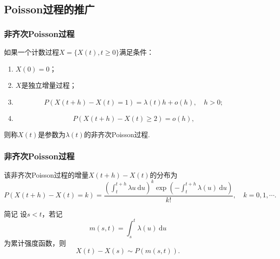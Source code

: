 \subsection{Poisson过程的推广}

\begin{frame}
    \frametitle{非齐次Poisson过程}
    \begin{mydefinition}[非齐次Poisson过程]
        如果一个计数过程$X=\{X(t),t\geqslant 0\}$满足条件：
        \begin{enumerate}
            \item $X(0)=0$；
            \item $X$是独立增量过程；
            \item \begin{equation}
                P(X(t+h)-X(t)=1)=\lambda(t)h+o(h),\quad h>0;
            \end{equation}
            \item \begin{equation}
                P(X(t+h)-X(t)\geqslant 2)=o(h),
            \end{equation}
        \end{enumerate}
        则称$X(t)$是参数为$\lambda(t)$的非齐次Poisson过程. 
    \end{mydefinition}

\end{frame}

\begin{frame}
    \frametitle{非齐次Poisson过程}
    \begin{myproposition}[非齐次Poisson过程的分布]
        该非齐次Poisson过程的增量$X(t+h)-X(t)$的分布为
        \begin{equation}
            P(X(t+h)-X(t)=k)
            =\frac{\left(\displaystyle\int_t^{t+h}\lambda u\ \mathrm du\right)^k\exp\left(-\displaystyle\int_t^{t+h}\lambda(u)\ \mathrm du\right)}{k!},
            \quad k=0,1,\cdots.
        \end{equation}
    \end{myproposition}
    \begin{exampleblock}{简记}
        设$s<t$，若记
        \begin{equation*}
            m(s,t)=\int_s^t\lambda(u)\ \mathrm du
        \end{equation*}
        为累计强度函数，则
        \begin{equation*}
            X(t)-X(s)\sim P(m(s,t)).
        \end{equation*}
    \end{exampleblock}
\end{frame}

